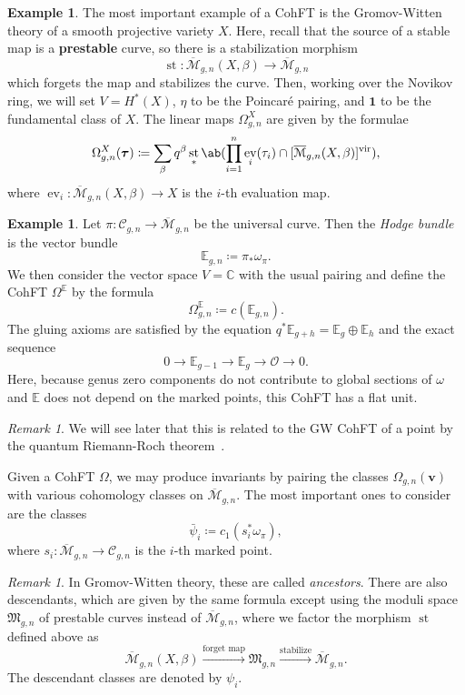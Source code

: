\documentclass[10pt]{amsart}
\theoremstyle{definition}
\newtheorem{exm}[thm]{Example}
\theoremstyle{remark}
\newtheorem{rmk}[thm]{Remark}
\theoremstyle{plain}
\theoremstyle{definition}
\theoremstyle{remark}
\newcommand{\C}{\mathbb{C}}
\newcommand{\E}{\mathbb{E}}
\newcommand{\Mbar}{\overline{\mathcal{M}}}
\newcommand{\mc}[1]{\mathcal{#1}}
\newcommand{\mf}[1]{\mathfrak{#1}}
\newcommand{\mbf}[1]{\mathbf{#1}}
\newcommand{\bv}{\mbf{v}}
\newcommand{\btau}{\bm{\tau}}
\newcommand{\mr}[1]{\mathrm{#1}}
\newcommand{\1}{\mathbf{1}}
\newcommand{\2}{\mathbf{2}}
\newcommand{\3}{\mathbf{3}}
\newcommand{\vir}{\mr{vir}}
\DeclareMathOperator{\ev}{ev}
\DeclareMathOperator{\st}{st}
\begin{document}
\begin{exm}
    The most important example of a CohFT is the Gromov-Witten theory of a smooth projective variety $X$. Here, recall that the source of a stable map is a \textbf{prestable} curve, so there is a stabilization morphism
    \[ \st \colon \Mbar_{g,n}(X,\beta) \to \Mbar_{g,n} \]
    which forgets the map and stabilizes the curve. Then, working over the Novikov ring, we will set $V = H^*(X)$, $\eta$ to be the Poincar\'e pairing, and $\1$ to be the fundamental class of $X$. The linear maps $\Omega^X_{g,n}$ are given by the formulae
    \[ \Omega_{g,n}^X(\btau) \coloneqq \sum_{\beta} q^{\beta} \st_* \ab(\prod_{i=1}^n \ev_i(\tau_i) \cap [\Mbar_{g,n}(X,\beta)]^{\vir}), \]
    where $\ev_i \colon \Mbar_{g,n}(X,\beta) \to X$ is the $i$-th evaluation map.
\end{exm}

\begin{exm}
    Let $\pi \colon \mc{C}_{g,n} \to \Mbar_{g,n}$ be the universal curve. Then the \textit{Hodge bundle} is the vector bundle 
    \[ \E_{g,n} \coloneqq \pi_* \omega_{\pi}. \]
    We then consider the vector space $V = \C$ with the usual pairing and define the CohFT $\Omega^{\E}$ by the formula
    \[ \Omega^{\E}_{g,n} \coloneqq c(\E_{g,n}). \]
    The gluing axioms are satisfied by the equation $q^* \E_{g+h} = \E_g \oplus \E_h$ and the exact sequence
    \[ 0 \to \E_{g-1} \to \E_g \to \mc{O} \to 0. \]
    Here, because genus zero components do not contribute to global sections of $\omega$ and $\E$ does not depend on the marked points, this CohFT has a flat unit.
\end{exm}

\begin{rmk}
    We will see later that this is related to the GW CohFT of a point by the quantum Riemann-Roch theorem~\cite{qrr}. 
\end{rmk}

Given a CohFT $\Omega$, we may produce invariants by pairing the classes $\Omega_{g,n}(\bv)$ with various cohomology classes on $\Mbar_{g,n}$. The most important ones to consider are the classes
\[ \bar{\psi}_i \coloneqq c_1( s_i^* \omega_{\pi} ), \]
where $s_i \colon \Mbar_{g,n} \to \mc{C}_{g,n}$ is the $i$-th marked point.

\begin{rmk}
    In Gromov-Witten theory, these are called \textit{ancestors}. There are also descendants, which are given by the same formula except using the moduli space $\mf{M}_{g,n}$ of prestable curves instead of $\Mbar_{g,n}$, where we factor the morphism $\st$ defined above as
    \[ \Mbar_{g,n}(X,\beta) \xrightarrow{\text{forget map}} \mf{M}_{g,n} \xrightarrow{\text{stabilize}} \Mbar_{g,n}. \]
    The descendant classes are denoted by $\psi_i$.
\end{rmk}
\end{document}
